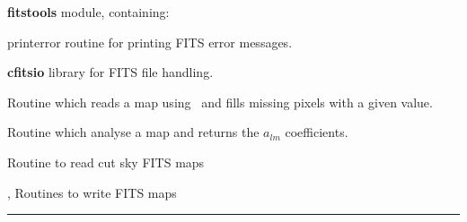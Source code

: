 \begin{modules}
  \begin{sulist}{} %
  \item[\textbf{fitstools}] module, containing:
  \item[printerror] routine for printing FITS error messages.
  \item[\textbf{cfitsio}] library for FITS file handling.		
  \end{sulist}
\end{modules}

\begin{related}
  \begin{sulist}{} %
  \item[\htmlref{input\_map}{sub:input_map}] Routine which reads a map using \thedocid\ and fills missing pixels with a given value.
  \item[\htmlref{map2alm}{sub:map2alm}] Routine which analyse a map and returns the $a_{lm}$
  coefficients.
  \item[\htmlref{read\_fits\_cut4}{sub:read_fits_cut4}] Routine to read cut sky \healpix FITS maps
  \item[\htmlref{write\_plm}{sub:write_plm}, \htmlref{write\_bintab}{sub:write_bintab}] Routines to write \healpix FITS maps
  \end{sulist}
\end{related}

\rule{\hsize}{2mm}

\newpage
